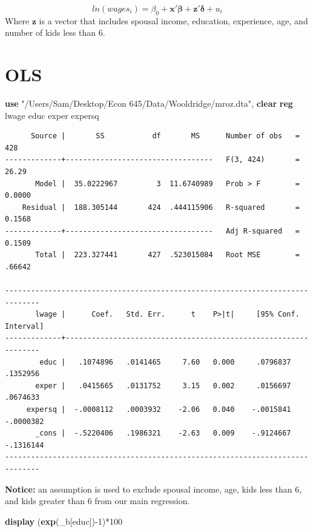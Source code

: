 \documentclass[
]{book}
\newenvironment{Shaded}{\begin{snugshade}}{\end{snugshade}}
\newcommand{\FunctionTok}[1]{\textcolor[rgb]{0.13,0.29,0.53}{\textbf{#1}}}
\newcommand{\KeywordTok}[1]{\textcolor[rgb]{0.13,0.29,0.53}{\textbf{#1}}}
\newcommand{\NormalTok}[1]{#1}
\newcommand{\StringTok}[1]{\textcolor[rgb]{0.31,0.60,0.02}{#1}}
\begin{document}
\[ ln(wages_{i})=\beta_{0}+ \mathbf{x'\beta} +\mathbf{z'\delta} + u_{i} \]
Where \(\mathbf{z}\) is a vector that includes spousal income, education, experience, age, and number of kids less than 6.

\section{OLS}\label{ols}

\begin{Shaded}
\begin{Highlighting}[]
\KeywordTok{use} \StringTok{"/Users/Sam/Desktop/Econ 645/Data/Wooldridge/mroz.dta"}\NormalTok{, }\KeywordTok{clear}
\KeywordTok{reg}\NormalTok{ lwage educ exper expersq    }
\end{Highlighting}
\end{Shaded}

\begin{verbatim}
      Source |       SS           df       MS      Number of obs   =       428
-------------+----------------------------------   F(3, 424)       =     26.29
       Model |  35.0222967         3  11.6740989   Prob > F        =    0.0000
    Residual |  188.305144       424  .444115906   R-squared       =    0.1568
-------------+----------------------------------   Adj R-squared   =    0.1509
       Total |  223.327441       427  .523015084   Root MSE        =    .66642

------------------------------------------------------------------------------
       lwage |      Coef.   Std. Err.      t    P>|t|     [95% Conf. Interval]
-------------+----------------------------------------------------------------
        educ |   .1074896   .0141465     7.60   0.000     .0796837    .1352956
       exper |   .0415665   .0131752     3.15   0.002     .0156697    .0674633
     expersq |  -.0008112   .0003932    -2.06   0.040    -.0015841   -.0000382
       _cons |  -.5220406   .1986321    -2.63   0.009    -.9124667   -.1316144
------------------------------------------------------------------------------
\end{verbatim}

\textbf{Notice:} an assumption is used to exclude spousal income, age, kids less than 6, and kids greater than 6 from our main regression.

\begin{Shaded}
\begin{Highlighting}[]
\KeywordTok{display}\NormalTok{ (}\FunctionTok{exp}\NormalTok{(\_b[educ]){-}1)*100}
\end{Highlighting}
\end{Shaded}
\end{document}
